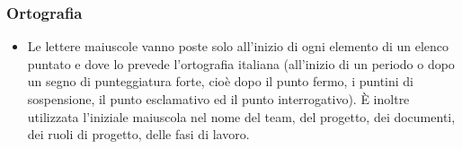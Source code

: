 \subsubsection{Ortografia}

\begin{itemize}

\item Le lettere maiuscole vanno poste solo all'inizio di ogni elemento di un elenco puntato e dove lo prevede l'ortografia italiana (all'inizio di un periodo o dopo un segno di punteggiatura forte, cioè dopo il punto fermo, i puntini di sospensione, il punto esclamativo ed il punto interrogativo). È inoltre utilizzata l'iniziale maiuscola nel nome del team, del progetto, dei documenti, dei ruoli di progetto, delle fasi di lavoro.


\end{itemize}

